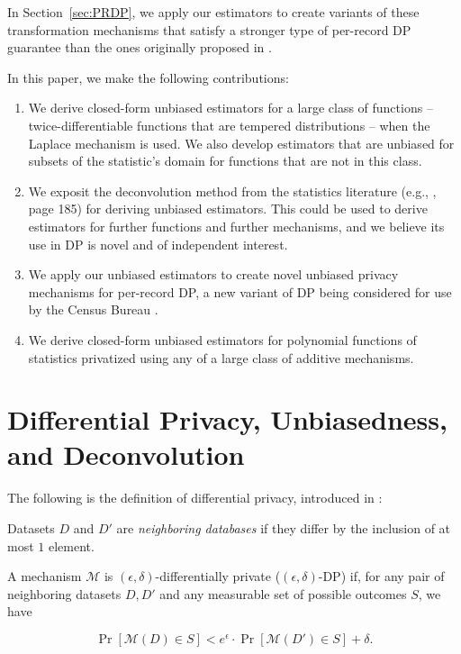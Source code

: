 \documentclass[11pt]{article}
\begin{document}
In Section~\ref{sec:PRDP}, we apply our estimators to create variants of these transformation mechanisms that satisfy a stronger type of per-record DP guarantee than the ones originally proposed in \cite{finleyEtAl2024}.

In this paper, we make the following contributions:
\begin{enumerate}
    \item We derive closed-form unbiased estimators for a large class of functions -- twice-differentiable functions that are tempered distributions -- when the Laplace mechanism is used. We also develop estimators that are unbiased for subsets of the statistic's domain for functions that are not in this class.
    \item We exposit the deconvolution method from the statistics literature (e.g., \cite{VoinovNikulin1993}, page 185) for deriving unbiased estimators. This could be used to derive estimators for further functions and further mechanisms, and we believe its use in DP is novel and of independent interest.
    \item We apply our unbiased estimators to create novel unbiased privacy mechanisms for per-record DP, a new variant of DP being considered for use by the Census Bureau \cite{BeckomEtAl2023}.
    \item We derive closed-form unbiased estimators for polynomial functions of statistics privatized using any of a large class of additive mechanisms.
\end{enumerate}




\section{Differential Privacy, Unbiasedness, and Deconvolution}
\label{sec:prelim}
The following is the definition of differential privacy, introduced in \cite{Dwork_McSherry_Nissim_Smith_2017}:
\begin{definition}
Datasets $D$ and $D'$ are \emph{neighboring databases} if they differ by the inclusion of at most $1$ element.
\end{definition}

\begin{definition} \label{def:DP}
A mechanism $\mathcal{M}$ is $(\epsilon,\delta)$-differentially private ($(\epsilon,\delta)$-DP) if, for any pair of neighboring datasets $D,D'$ and any measurable set of possible outcomes $S$, we have

$$\Pr[\mathcal{M}(D) \in S] < e^\epsilon \cdot \Pr[\mathcal{M}(D') \in S] + \delta.$$
\end{definition}
\end{document}
